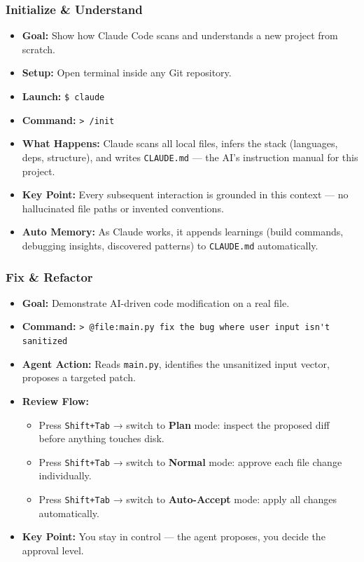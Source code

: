 \begin{frame}[fragile]\frametitle{Initialize \& Understand}
  \begin{itemize}
    \item \textbf{Goal:} Show how Claude Code scans and understands a new project from scratch.
    \item \textbf{Setup:} Open terminal inside any Git repository.
    \item \textbf{Launch:} \lstinline|$ claude|
    \item \textbf{Command:} \lstinline|> /init|
    \item \textbf{What Happens:} Claude scans all local files, infers the stack (languages, deps, structure), and writes \texttt{CLAUDE.md} --- the AI's instruction manual for this project.
    \item \textbf{Key Point:} Every subsequent interaction is grounded in this context --- no hallucinated file paths or invented conventions.
    \item \textbf{Auto Memory:} As Claude works, it appends learnings (build commands, debugging insights, discovered patterns) to \texttt{CLAUDE.md} automatically.
  \end{itemize}
\end{frame}

\begin{frame}[fragile]\frametitle{Fix \& Refactor}
  \begin{itemize}
    \item \textbf{Goal:} Demonstrate AI-driven code modification on a real file.
    \item \textbf{Command:} \lstinline|> @file:main.py fix the bug where user input isn't sanitized|
    \item \textbf{Agent Action:} Reads \texttt{main.py}, identifies the unsanitized input vector, proposes a targeted patch.
    \item \textbf{Review Flow:}
      \begin{itemize}
        \item Press \texttt{Shift+Tab} → switch to \textbf{Plan} mode: inspect the proposed diff before anything touches disk.
        \item Press \texttt{Shift+Tab} → switch to \textbf{Normal} mode: approve each file change individually.
        \item Press \texttt{Shift+Tab} → switch to \textbf{Auto-Accept} mode: apply all changes automatically.
      \end{itemize}
    \item \textbf{Key Point:} You stay in control --- the agent proposes, you decide the approval level.
  \end{itemize}
\end{frame}

